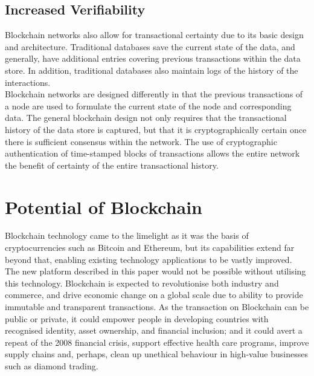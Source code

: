 \subsection{Increased Verifiability}
Blockchain networks also allow for transactional certainty due to its basic design and architecture. Traditional databases save the current state of the data, and generally, have additional entries covering previous transactions within the data store. In addition, traditional databases also maintain logs of the history of the interactions.
\\Blockchain networks are designed differently in that the previous transactions of a node are used to formulate the current state of the node and corresponding data. The general blockchain design not only requires that the transactional history of the data store is captured, but that it is cryptographically certain once there is sufficient consensus within the network. The use of cryptographic authentication of time-stamped blocks of transactions allows the entire network the benefit of certainty of the entire transactional history.

\section{Potential of Blockchain}
Blockchain technology came to the limelight as it was the basis of cryptocurrencies such as Bitcoin and Ethereum, but its capabilities extend far beyond that, enabling existing technology applications to be vastly improved. The new platform described in this paper would not be possible without utilising this technology. Blockchain is expected to revolutionise both industry and commerce, and drive economic change on a global scale due to ability to provide immutable and transparent transactions.  As the transaction on Blockchain can be public or private, it could empower people in developing countries with recognised identity, asset ownership, and financial inclusion; and it could avert a repeat of the 2008 financial crisis, support effective health care programs, improve supply chains and, perhaps, clean up unethical behaviour in high-value businesses such as diamond trading.\cite{Underwood2016BlockchainBitcoin}

